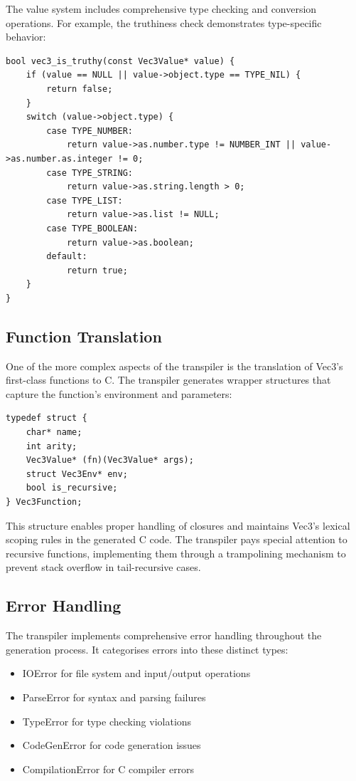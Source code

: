 The value system includes comprehensive type checking and conversion operations.
For example, the truthiness check demonstrates type-specific behavior:

\begin{verbatim}
bool vec3_is_truthy(const Vec3Value* value) {
    if (value == NULL || value->object.type == TYPE_NIL) {
        return false;
    }
    switch (value->object.type) {
        case TYPE_NUMBER:
            return value->as.number.type != NUMBER_INT || value->as.number.as.integer != 0;
        case TYPE_STRING:
            return value->as.string.length > 0;
        case TYPE_LIST:
            return value->as.list != NULL;
        case TYPE_BOOLEAN:
            return value->as.boolean;
        default:
            return true;
    }
}
\end{verbatim}

\subsection{Function Translation}\label{subsec:function-translation}

One of the more complex aspects of the transpiler is the translation of Vec3's first-class functions to C. The transpiler generates wrapper structures that capture the function's environment and parameters:

\begin{verbatim}
typedef struct {
    char* name;
    int arity;
    Vec3Value* (fn)(Vec3Value* args);
    struct Vec3Env* env;
    bool is_recursive;
} Vec3Function;
\end{verbatim}

This structure enables proper handling of closures and maintains Vec3's lexical scoping rules in the generated C code. 
The transpiler pays special attention to recursive functions, implementing them through a trampolining mechanism to prevent stack overflow in tail-recursive cases.

\subsection{Error Handling}\label{subsec:error-handling}

The transpiler implements comprehensive error handling throughout the generation process. 
It categorises errors into these distinct types:

\begin{itemize}[nolistsep]
\item IOError for file system and input/output operations
\item ParseError for syntax and parsing failures
\item TypeError for type checking violations
\item CodeGenError for code generation issues
\item CompilationError for C compiler errors
\end{itemize}

